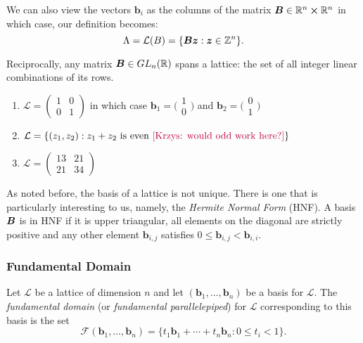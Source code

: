 \begin{remark}
    We can also view the vectors $\bm{b}_i$ as the columns of the matrix $\boldsymbol{B} \in \mathbb{R}^n \cross \mathbb{R}^n$ in which case, our definition becomes:
    $$\Lambda = \mathcal{L}(B) = \{\boldsymbol{Bz} :  \boldsymbol{z} \in \mathbb{Z}^n \}.$$
\end{remark}

Reciprocally, any matrix $\boldsymbol{B} \in GL_n(\mathbb{R})$ spans a lattice: the set of all integer linear combinations of its rows.

\begin{example}
\begin{enumerate}
    \item $\mathcal{L} = \begin{pmatrix}
        1 & 0\\
        0 & 1
	\end{pmatrix}$ in which case $\bm{b}_1 = \big(\begin{smallmatrix}
          1\\
          0
	\end{smallmatrix}\big)$ and $\bm{b}_2 = \big(\begin{smallmatrix}
          0\\
          1
        \end{smallmatrix}\big)$
    \item $\mathcal{L} = \{(z_1,z_2) : z_1 + z_2 \text{ is even \textcolor{purple}{[Krzys: would odd work here?]}}\}$
    \item $\mathcal{L} = \begin{pmatrix}
        13 & 21\\
        21 & 34
        \end{pmatrix}$
\end{enumerate}
\end{example}

As noted before, the basis of a lattice is not unique. There is one that is particularly interesting to us, namely, the \textit{Hermite Normal Form} (HNF). A basis $\boldsymbol{B}$ is in HNF if it is upper triangular, all elements on the diagonal are strictly positive and any other element $\bm{b}_{i,j}$ satisfies $0 \leq \bm{b}_{i,j} < \bm{b}_{i,i}$.

\subsubsection*{Fundamental Domain}
\begin{definition} \label{fundamental}
    Let $\mathcal{L}$ be a lattice of dimension $n$ and let $(\bm{b}_1, \dots, \bm{b}_n)$ be a basis for $\mathcal{L}$. The \textit{fundamental domain} (or \textit{fundamental parallelepiped}) for $\mathcal{L}$ corresponding to this basis is the set
    $$ \mathcal{F}(\bm{b}_1, \dots, \bm{b}_n) = \{t_1\bm{b}_1 + \cdots + t_n\bm{b}_n : 0 \leq t_i < 1 \}.$$
\end{definition}

